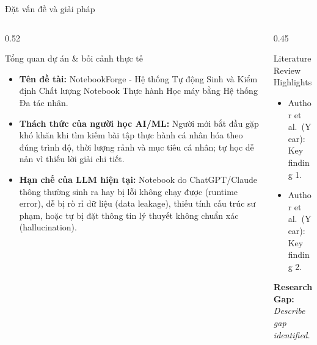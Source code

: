 \documentclass[aspectratio=169, 10pt, t]{beamer}
\begin{document}
\begin{frame}{Đặt vấn đề và giải pháp}
  \begin{columns}[T]
    \begin{column}{0.52\textwidth}
      \begin{block}{Tổng quan dự án \& bối cảnh thực tế}
        \begin{itemize}
          \item \textbf{Tên đề tài:} NotebookForge - 
          Hệ thống Tự động Sinh và Kiểm định Chất lượng 
          Notebook Thực hành Học máy bằng Hệ thống Đa tác nhân.
          \item \textbf{Thách thức của người học AI/ML:} Người mới bắt 
          đầu gặp khó khăn khi tìm kiếm bài tập thực hành 
          cá nhân hóa theo đúng trình độ, thời lượng rảnh 
          và mục tiêu cá nhân; tự học dễ nản vì thiếu lời giải chi tiết.
          \item \textbf{Hạn chế của LLM hiện tại:} Notebook 
          do ChatGPT/Claude thông thường sinh ra hay bị lỗi 
          không chạy được (runtime error), dễ bị rò rỉ dữ liệu 
          (data leakage), thiếu tính cấu trúc sư phạm, hoặc tự 
          bị đặt thông tin lý thuyết không chuẩn xác (hallucination).
        \end{itemize}
      \end{block}
    \end{column}
    \begin{column}{0.45\textwidth}
      \begin{block}{Literature Review Highlights}
        \begin{itemize}
          \item Author et al.\ (Year): Key finding 1.\cite{ref1}
          \item Author et al.\ (Year): Key finding 2.\cite{ref2}
        \end{itemize}
        \vspace{0.5em}
        \textbf{\textcolor{MLIOTcoral}{Research Gap:}}
        \textit{Describe gap identified.}
      \end{block}
    \end{column}
  \end{columns}
\end{frame}
\end{document}
